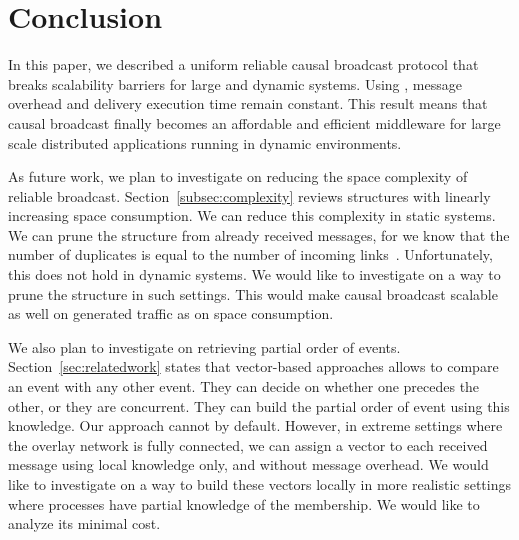 
\section{Conclusion}
\label{sec:conclusion}

In this paper, we described a uniform reliable causal broadcast protocol that
breaks scalability barriers for large and dynamic systems. Using \CBROADCAST,
message overhead and delivery execution time remain constant.
This result means that causal broadcast finally becomes an affordable and
efficient middleware for large scale distributed applications running in dynamic
environments.

As future work, we plan to investigate on reducing the space complexity of
reliable broadcast. Section~\ref{subsec:complexity} reviews structures with
linearly increasing space consumption. We can reduce this complexity in static
systems. We can prune the structure from already received messages, for we know
that the number of duplicates is equal to the number of incoming
links~\cite{raynal2013distributed}. Unfortunately, this does not hold in dynamic
systems. We would like to investigate on a way to prune the structure in such
settings. This would make causal broadcast scalable as well on generated traffic
as on space consumption.

We also plan to investigate on retrieving partial order of
events. Section~\ref{sec:relatedwork} states that vector-based approaches allows
to compare an event with any other event. They can decide on whether one
precedes the other, or they are concurrent. They can build the partial order of
event using this knowledge. Our approach cannot by default. However, in extreme
settings where the overlay network is fully connected, we can assign a vector to
each received message using local knowledge only, and without message
overhead. We would like to investigate on a way to build these vectors locally
in more realistic settings where processes have partial knowledge of the
membership. We would like to analyze its minimal cost.

